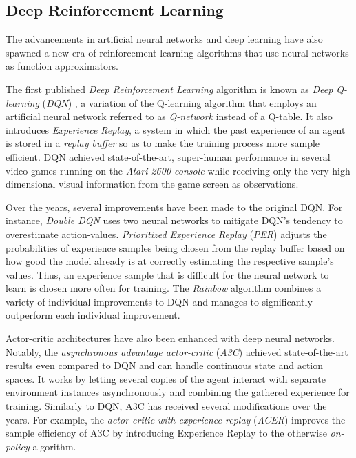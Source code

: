 \subsection{Deep Reinforcement Learning}
The advancements in artificial neural networks and deep learning have also spawned a new era of reinforcement learning algorithms that use neural networks as function approximators.

The first published \textit{Deep Reinforcement Learning} algorithm is known as \textit{Deep Q-learning} (\textit{DQN}) \cite{dqn}, a variation of the Q-learning algorithm that employs an artificial neural network referred to as \textit{Q-network} instead of a Q-table. It also introduces \textit{Experience Replay}, a system in which the past experience of an agent is stored in a \textit{replay buffer} so as to make the training process more sample efficient. DQN achieved state-of-the-art, super-human performance in several video games running on the \textit{Atari 2600 console} while receiving only the very high dimensional visual information from the game screen as observations.

Over the years, several improvements have been made to the original DQN. For instance, \textit{Double DQN} \cite{double-dqn} uses two neural networks to mitigate DQN's tendency to overestimate action-values. \textit{Prioritized Experience Replay} (\textit{PER}) \cite{per} adjusts the probabilities of experience samples being chosen from the replay buffer based on how good the model already is at correctly estimating the respective sample's values. Thus, an experience sample that is difficult for the neural network to learn is chosen more often for training. The \textit{Rainbow} algorithm \cite{rainbow} combines a variety of individual improvements to DQN and manages to significantly outperform each individual improvement.

Actor-critic architectures have also been enhanced with deep neural networks. Notably, the \textit{asynchronous advantage actor-critic} (\textit{A3C}) \cite{a3c} achieved state-of-the-art results even compared to DQN and can handle continuous state and action spaces. It works by letting several copies of the agent interact with separate environment instances asynchronously and combining the gathered experience for training. Similarly to DQN, A3C has received several modifications over the years. For example, the \textit{actor-critic with experience replay} (\textit{ACER}) \cite{acer} improves the sample efficiency of A3C by introducing Experience Replay to the otherwise \textit{on-policy} \cite{bible} algorithm.

